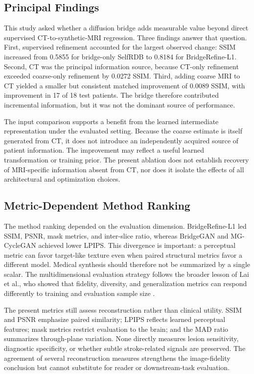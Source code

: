 \subsection{Principal Findings}

This study asked whether a diffusion bridge adds measurable value beyond direct supervised CT-to-synthetic-MRI regression. Three findings answer that question. First, supervised refinement accounted for the largest observed change: SSIM increased from 0.5855 for bridge-only SelfRDB to 0.8184 for BridgeRefine-L1. Second, CT was the principal information source, because CT-only refinement exceeded coarse-only refinement by 0.0272 SSIM. Third, adding coarse MRI to CT yielded a smaller but consistent matched improvement of 0.0089 SSIM, with improvement in 17 of 18 test patients. The bridge therefore contributed incremental information, but it was not the dominant source of performance.

The input comparison supports a benefit from the learned intermediate representation under the evaluated setting. Because the coarse estimate is itself generated from CT, it does not introduce an independently acquired source of patient information. The improvement may reflect a useful learned transformation or training prior. The present ablation does not establish recovery of MRI-specific information absent from CT, nor does it isolate the effects of all architectural and optimization choices.

\subsection{Metric-Dependent Method Ranking}

The method ranking depended on the evaluation dimension. BridgeRefine-L1 led SSIM, PSNR, mask metrics, and inter-slice ratio, whereas BridgeGAN and MG-CycleGAN achieved lower LPIPS. This divergence is important: a perceptual metric can favor target-like texture even when paired structural metrics favor a different model. Medical synthesis should therefore not be summarized by a single scalar. The multidimensional evaluation strategy follows the broader lesson of Lai et al., who showed that fidelity, diversity, and generalization metrics can respond differently to training and evaluation sample size \cite{lai2025stylegan}.

The present metrics still assess reconstruction rather than clinical utility. SSIM and PSNR emphasize paired similarity; LPIPS reflects learned perceptual features; mask metrics restrict evaluation to the brain; and the MAD ratio summarizes through-plane variation. None directly measures lesion sensitivity, diagnostic specificity, or whether subtle stroke-related signals are preserved. The agreement of several reconstruction measures strengthens the image-fidelity conclusion but cannot substitute for reader or downstream-task evaluation.

